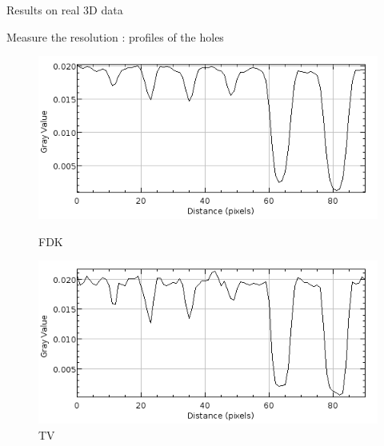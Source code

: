 \documentclass[latex]{beamer}
\begin{document}
\begin{frame}{Results on real 3D data}
\begin{block}{Measure the resolution : profiles of the holes}
\begin{figure}
\begin{minipage}[htb]{0.46\linewidth}
\centering
\includegraphics[scale=0.30]{AnalyzeHolesVolIQI_FDKProj300.png}
\caption*{FDK}
\end{minipage} \hfill
\begin{minipage}[htb]{0.46\linewidth}
\centering
\includegraphics[scale=0.30]{AnalyzeHolesVolIQI_TVProj300.png}
\caption*{TV}
\end{minipage} \vfill
\begin{minipage}[htb]{0.46\linewidth}
\centering

\end{minipage}
\end{figure}
\end{block}
\end{frame}
\end{document}
